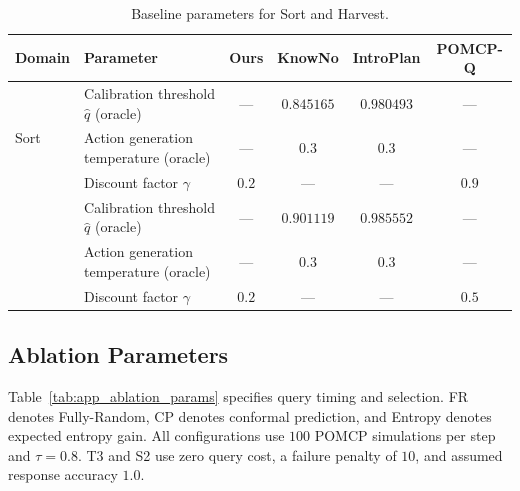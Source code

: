 \begin{table}[!htbp]
\centering
\caption{Baseline parameters for Sort and Harvest.}
\label{tab:app_baseline_params}
\footnotesize
\setlength{\tabcolsep}{2pt}
\renewcommand{\arraystretch}{1.05}
\setlength{\extrarowheight}{0pt}
\begin{tabular*}{\textwidth}{@{\extracolsep{\fill}}llcccc@{}}
\toprule
Domain & Parameter & \textbf{Ours} & KnowNo & IntroPlan & POMCP-Q \\
\midrule
\multirow{3}{*}{Sort} & Calibration threshold $\hat{q}$ (oracle) & --- & $0.845165$ & $0.980493$ & --- \\
 & Action generation temperature (oracle) & --- & $0.3$ & $0.3$ & --- \\
 & Discount factor $\gamma$ & $0.2$ & --- & --- & $0.9$ \\
\addlinespace[3pt]
\multirow{3}{*}{Harvest} & Calibration threshold $\hat{q}$ (oracle) & --- & $0.901119$ & $0.985552$ & --- \\
 & Action generation temperature (oracle) & --- & $0.3$ & $0.3$ & --- \\
 & Discount factor $\gamma$ & $0.2$ & --- & --- & $0.5$ \\
\bottomrule
\end{tabular*}
\end{table}

\subsection{Ablation Parameters}\label{appx:ablation_configs}
Table~\ref{tab:app_ablation_params} specifies query timing and selection. FR denotes Fully-Random, CP denotes conformal prediction, and Entropy denotes expected entropy gain. All configurations use $100$ POMCP simulations per step and $\tau=0.8$. T3 and S2 use zero query cost, a failure penalty of $10$, and assumed response accuracy $1.0$.


